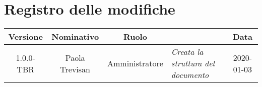 \section*{Registro delle modifiche}
\renewcommand{\arraystretch}{1.8}

  \begin{longtable}{|c|c|c|p{3.8cm}|c|}
    \hline

    \rowcolor{header}
    \textbf{Versione} & \textbf{Nominativo} & \textbf{Ruolo} & \centering{\textbf{Descrizione}} & \textbf{Data}\\

    \hline

    1.0.0-TBR & Paola Trevisan & Amministratore & \small{\textit{Creata la struttura del documento}} & 2020-01-03\\

    \hline
  \end{longtable}
